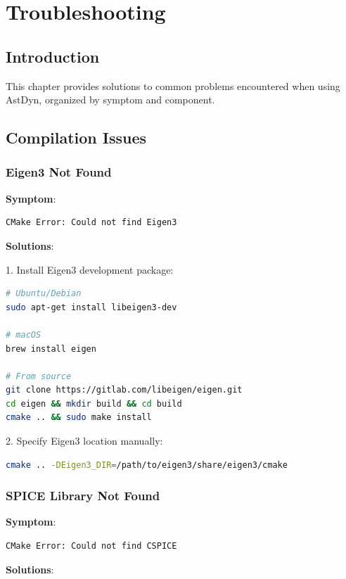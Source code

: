 \chapter{Troubleshooting}
\label{ch:troubleshooting}

\section{Introduction}

This chapter provides solutions to common problems encountered when using AstDyn, organized by symptom and component.

\section{Compilation Issues}

\subsection{Eigen3 Not Found}

\textbf{Symptom}:
\begin{verbatim}
CMake Error: Could not find Eigen3
\end{verbatim}

\textbf{Solutions}:

1. Install Eigen3 development package:
\begin{lstlisting}[language=bash]
# Ubuntu/Debian
sudo apt-get install libeigen3-dev

# macOS
brew install eigen

# From source
git clone https://gitlab.com/libeigen/eigen.git
cd eigen && mkdir build && cd build
cmake .. && sudo make install
\end{lstlisting}

2. Specify Eigen3 location manually:
\begin{lstlisting}[language=bash]
cmake .. -DEigen3_DIR=/path/to/eigen3/share/eigen3/cmake
\end{lstlisting}

\subsection{SPICE Library Not Found}

\textbf{Symptom}:
\begin{verbatim}
CMake Error: Could not find CSPICE
\end{verbatim}

\textbf{Solutions}:

